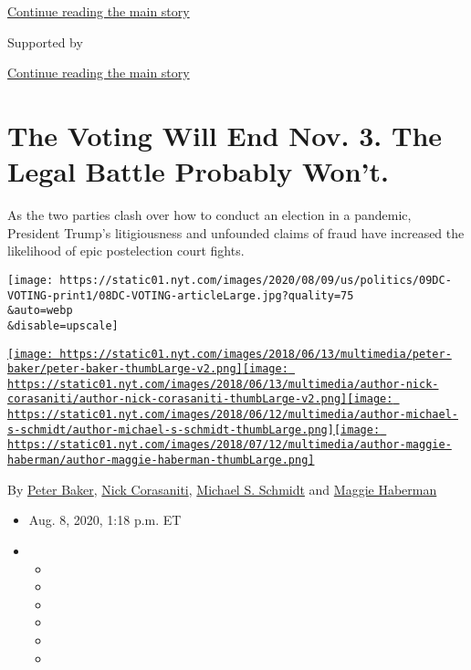 \protect\hyperlink{after-top}{Continue reading the main story}

Supported by

\protect\hyperlink{after-sponsor}{Continue reading the main story}

\hypertarget{the-voting-will-end-nov-3-the-legal-battle-probably-wont}{%
\section{The Voting Will End Nov. 3. The Legal Battle Probably
Won't.}\label{the-voting-will-end-nov-3-the-legal-battle-probably-wont}}

As the two parties clash over how to conduct an election in a pandemic,
President Trump's litigiousness and unfounded claims of fraud have
increased the likelihood of epic postelection court fights.

\texttt{[image: https://static01.nyt.com/images/2020/08/09/us/politics/09DC-VOTING-print1/08DC-VOTING-articleLarge.jpg?quality=75\\\&auto=webp\\\&disable=upscale]}

\href{https://www.nytimes.com/by/peter-baker}{\texttt{[image: https://static01.nyt.com/images/2018/06/13/multimedia/peter-baker/peter-baker-thumbLarge-v2.png]}}\href{https://www.nytimes.com/by/nick-corasaniti}{\texttt{[image: https://static01.nyt.com/images/2018/06/13/multimedia/author-nick-corasaniti/author-nick-corasaniti-thumbLarge-v2.png]}}\href{https://www.nytimes.com/by/michael-s-schmidt}{\texttt{[image: https://static01.nyt.com/images/2018/06/12/multimedia/author-michael-s-schmidt/author-michael-s-schmidt-thumbLarge.png]}}\href{https://www.nytimes.com/by/maggie-haberman}{\texttt{[image: https://static01.nyt.com/images/2018/07/12/multimedia/author-maggie-haberman/author-maggie-haberman-thumbLarge.png]}}

By \href{https://www.nytimes.com/by/peter-baker}{Peter Baker},
\href{https://www.nytimes.com/by/nick-corasaniti}{Nick Corasaniti},
\href{https://www.nytimes.com/by/michael-s-schmidt}{Michael S. Schmidt}
and \href{https://www.nytimes.com/by/maggie-haberman}{Maggie Haberman}

\begin{itemize}
\item
  Aug. 8, 2020, 1:18 p.m. ET
\item
  \begin{itemize}
  \item
  \item
  \item
  \item
  \item
  \item
  \end{itemize}
\end{itemize}

